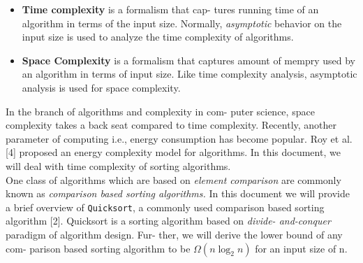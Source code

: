 \documentclass[a4paper, 15pt,twocolumn]{article}
\begin{document}
\begin{itemize}
\item \textbf{Time complexity} is a formalism that cap-
tures running time of an algorithm in terms of the input size. Normally, \textit{asymptotic} behavior on the input size is used to analyze the time complexity of algorithms.
\item \textbf{Space Complexity} is a formalism that captures amount of mempry used by an algorithm in terms of input size. Like time complexity analysis, asymptotic analysis is used for space complexity.

\end{itemize}
In the branch of algorithms and complexity in com-
puter science, space complexity takes a back seat
compared to time complexity. Recently, another
parameter of computing i.e., energy consumption
has become popular. Roy et al. [4] proposed an energy complexity model for algorithms. In this document, we will deal with time complexity of sorting
algorithms.\\
One class of algorithms which are based on \textit{element comparison} are commonly known as \textit{comparison based sorting algorithms.} In this document we
will provide a brief overview of \texttt{Quicksort}, a commonly
used comparison based sorting algorithm [2].
Quicksort is a sorting algorithm based on\textit{ divide-
and-conquer} paradigm of algorithm design. Fur-
ther, we will derive the lower bound of any com-
parison based sorting algorithm to be $\Omega(n\log_2n)$
for an input size of n.
\end{document}
